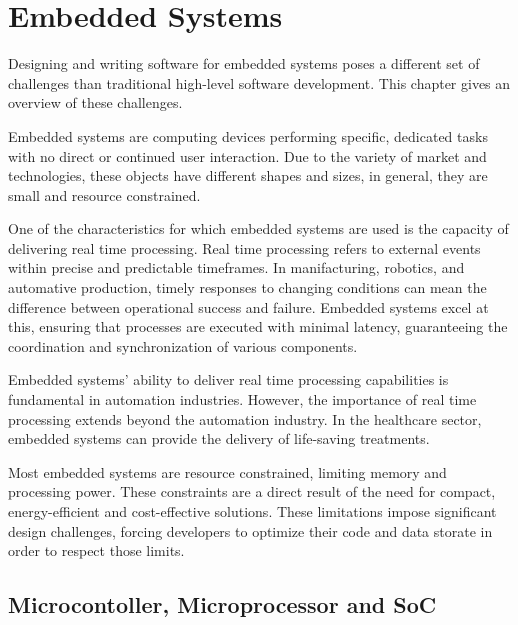 

\chapter{Embedded Systems}

Designing and writing software for embedded systems poses a different set of
challenges than traditional high-level software development.
This chapter gives an overview of these challenges.

Embedded systems are computing devices performing specific, dedicated tasks
with no direct or continued user interaction. \cite{embedded_systems_architecture}
Due to the variety of market and technologies, these objects have different
shapes and sizes, in general, they are small and resource constrained.

One of the characteristics for which embedded systems are used is the capacity
of delivering real time processing.
Real time processing refers to external events within precise and predictable
timeframes. In manifacturing, robotics, and automative production, timely
responses to changing conditions can mean the difference between operational
success and failure. Embedded systems excel at this, ensuring that processes
are executed with minimal latency, guaranteeing the coordination and
synchronization of various components.

Embedded systems' ability to deliver real time processing capabilities is
fundamental in automation industries. 
However, the importance of real time processing extends beyond the automation
industry. In the healthcare sector, embedded systems can provide the delivery
of life-saving treatments.

Most embedded systems are resource constrained, limiting memory and processing
power.
These constraints are a direct result of the need for compact, energy-efficient
and cost-effective solutions.
These limitations impose significant design challenges, forcing developers to
optimize their code and data storate in order to respect those limits.

\section{Microcontoller, Microprocessor and SoC}

